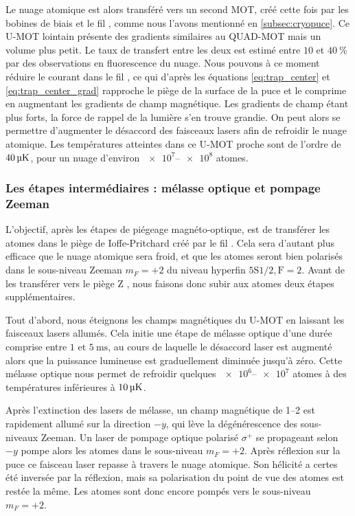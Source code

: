 Le nuage atomique est alors transféré vers un second MOT, créé cette fois par les bobines de biais et le fil , comme nous l'avons mentionné en \ref{subsec:cryopuce}.
Ce \og U-MOT lointain\fg{} présente des gradients similaires au QUAD-MOT mais un volume plus petit.
Le taux de transfert entre les deux est estimé entre $\num{10}$ et $\SI{40}{\percent}$ par des observations en fluorescence du nuage.
Nous pouvons à ce moment réduire le courant dans le fil , ce qui d'après les équations \eqref{eq:trap_center} et \eqref{eq:trap_center_grad} rapproche le piège de la surface de la puce et le comprime en augmentant les gradients de champ magnétique.
Les gradients de champ étant plus forts, la force de rappel de la lumière s'en trouve grandie.
On peut alors se permettre d'augmenter le désaccord des faisceaux lasers afin de refroidir le nuage atomique.
Les températures atteintes dans ce \og U-MOT proche\fg{} sont de l'ordre de $\SI{40}{\si{\micro\kelvin}}$, pour un nuage d'environ $\numrange{e7}{e8}$ atomes.

	\subsubsection*{Les étapes intermédiaires : mélasse optique et pompage Zeeman}
\noindent L'objectif, après les étapes de piégeage magnéto-optique, est de transférer les atomes dans le piège de Ioffe-Pritchard créé par le fil .
Cela sera d'autant plus efficace que le nuage atomique sera froid, et que les atomes seront bien polarisés dans le sous-niveau Zeeman $m_F=+2$ du niveau hyperfin $\mathrm{5S1/2,F=2}$.
Avant de les transférer vers le \og piège Z \fg{}, nous faisons donc subir aux atomes deux étapes supplémentaires.

Tout d'abord, nous éteignons les champs magnétiques du U-MOT en laissant les faisceaux lasers allumés.
Cela initie une étape de mélasse optique d'une durée comprise entre $\num{1}$ et $\SI{5}{\ms}$, au cours de laquelle le désaccord laser est augmenté alors que la puissance lumineuse est graduellement diminuée jusqu'à zéro.
Cette mélasse optique nous permet de refroidir quelques $\numrange{e6}{e7}$ atomes à des températures inférieures à $\SIvv{10}{\uK}$.

Après l'extinction des lasers de mélasse, un champ magnétique de \SIrange{1}{2}{\gauss} est rapidement allumé sur la direction $-y$, qui lève la dégénérescence des sous-niveaux Zeeman.
Un laser de pompage optique polarisé $\sigma ^+$ se propageant selon $-y$ pompe alors les atomes dans le sous-niveau $m_F=+2$.
Après réflexion sur la puce ce faisceau laser repasse à travers le nuage atomique.
Son hélicité a certes été inversée par la réflexion, mais sa polarisation du point de vue des atomes est restée la même.
Les atomes sont donc encore pompés vers le sous-niveau $m_F=+2$.

